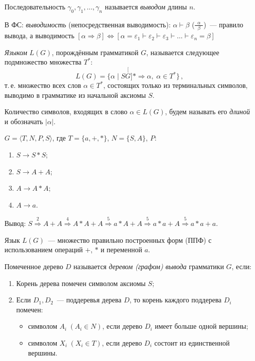 Последовательность $\gamma_0, \gamma_1, \ldots, \gamma_n$ называется
\emph{выводом} длины $n$.

В ФС: \emph{выводимость} (непосредственная выводимость): $\alpha
\vdash \beta$ ($\frac{\phantom{0}\alpha\phantom{0}}{\beta}$)~--- правило
вывода, а выводимость $[\alpha \Rightarrow \beta] \Leftrightarrow
[\alpha = \varepsilon_1 \vdash \varepsilon_2 \vdash \varepsilon_3
\vdash \ldots \vdash \varepsilon_n = \beta]$

\begin{defin}
  \emph{Языком} $L(G)$, порождённым грамматикой $G$, называется
  следующее подмножество множества $T^*$:
  \begin{equation}
    \label{eq:lang}
    L(G) = \{\alpha \mid S \stackrel[G]{*}{\Rightarrow} \alpha,\;
    \alpha \in T^*\}\,,
  \end{equation}
  т.\,е. множество всех слов $\alpha \in T^*$, состоящих только из
  терминальных символов, выводимо в грамматике из начальной аксиомы $S$.
\end{defin}

\begin{defin}
  Количество символов, входящих в слово $\alpha \in L(G)$, будем
  называть его \emph{длиной} и обозначать $|\alpha|$.
\end{defin}

\begin{ex}
  \label{ex:G}
  $G = \langle T,N,P,S\rangle$, где $T=\{a,+,*\}$, $N = \{S,A\}$,
  $P$:
  \begin{enumerate}
  \item $S \to S*S$;
  \item $S \to A+A$;
  \item $A \to A*A$;
  \item $A \to a$.
  \end{enumerate}
  Вывод:
  $S \stackrel{2}{\Rightarrow} A+A \stackrel{4}{\Rightarrow} A*A+A
  \stackrel{5}{\Rightarrow} a*A+A \stackrel{5}{\Rightarrow} a*a+A
  \stackrel{5}{\Rightarrow} a*a+a$.

Язык $L(G)$~--- множество правильно построенных форм (ППФ) с
использованием операций $+$, $*$ и переменной $a$.
\end{ex}

\begin{defin}
  Помеченное дерево $D$ называется \emph{деревом (графом) вывода}
  грамматики $G$, если:
  \begin{enumerate}
  \item Корень дерева помечен символом аксиомы $S$;
  \item Если $D_1,D_2$~--- поддеревья дерева $D$, то корень каждого
    поддерева $D_i$ помечен:
    \begin{itemize}
    \item символом $A_i\;(A_i \in N)$, если дерево $D_i$ имеет больше
      одной вершины;
    \item символом $X_i\;(X_i \in T)$, если дерево $D_i$ состоит из
      единственной вершины.
    \end{itemize}
  \end{enumerate}
\end{defin}

